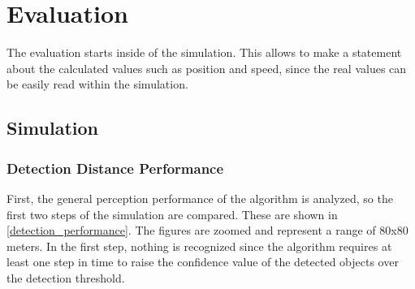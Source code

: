 \documentclass[11pt,oneside,openright]{mpreport}
\begin{document}
\chapter{Evaluation}


The evaluation starts inside of the simulation. This allows to make a statement 
about the calculated values such as position and speed, since the real values can be easily read within the simulation.

\section{Simulation}

\subsection{Detection Distance Performance}

First, the general perception performance of the algorithm is analyzed, so the first two steps of the simulation are compared.
These are shown in \cref{detection_performance}. The figures are zoomed and represent a range of 80x80 meters.
In the first step, nothing is recognized since the algorithm requires at least one step in time to raise the confidence value of the detected objects over the detection threshold.
\end{document}
